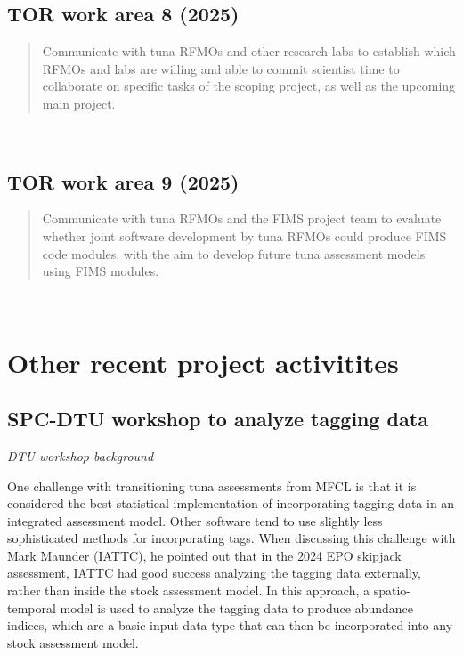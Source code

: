 \documentclass{SCreport}
\begin{document}
\vspace{2ex}

\newpage

\subsection{TOR work area 8 (2025)}

\begin{quote}\sf
  Communicate with tuna RFMOs and other research labs to establish which RFMOs
  and labs are willing and able to commit scientist time to collaborate on
  specific tasks of the scoping project, as well as the upcoming main project.
\end{quote}

\vspace{2ex}

~

\vspace{2ex}

\subsection{TOR work area 9 (2025)}

\begin{quote}\sf
  Communicate with tuna RFMOs and the FIMS project team to evaluate whether
  joint software development by tuna RFMOs could produce FIMS code modules, with
  the aim to develop future tuna assessment models using FIMS modules.
\end{quote}

\vspace{2ex}

~

\vspace{2ex}

\section{Other recent project activitites}

\subsection{SPC-DTU workshop to analyze tagging data}
\label{sec:dtu-2025-workshop}

\textit{DTU workshop background}

One challenge with transitioning tuna assessments from MFCL is that it is
considered the best statistical implementation of incorporating tagging data in
an integrated assessment model. Other software tend to use slightly less
sophisticated methods for incorporating tags. When discussing this challenge
with Mark Maunder (IATTC), he pointed out that in the 2024 EPO skipjack
assessment, IATTC had good success analyzing the tagging data externally, rather
than inside the stock assessment model. In this approach, a spatio-temporal
model is used to analyze the tagging data to produce abundance indices, which
are a basic input data type that can then be incorporated into any stock
assessment model.
\end{document}
